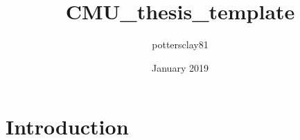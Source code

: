 \documentclass{article}
\title{CMU_thesis_template}
\author{pottersclay81 }
\date{January 2019}
\begin{document}
\maketitle

\section{Introduction}
\end{document}
